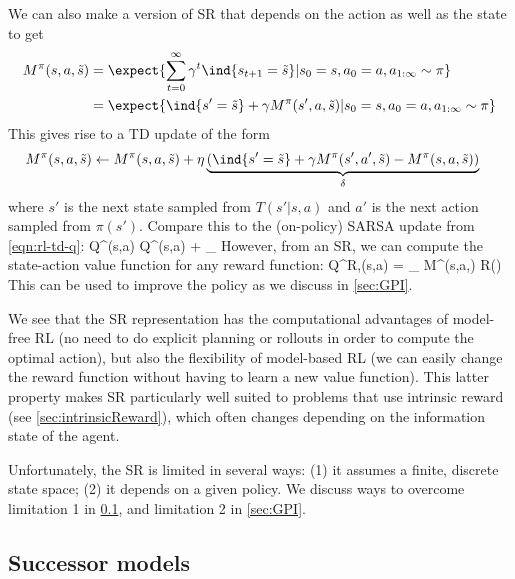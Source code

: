 We can also make a version of SR that depends on the action
as well as the state to get
\begin{align}
M^{\pi}(s,a,\tilde{s})
&= \expect{\sum_{t=0}^{\infty} \gamma^t \ind{s_{t+1}=\tilde{s}}
  \vert s_0=s, a_0=a, a_{1:\infty} \sim \pi} \\
&= \expect{\ind{s'=\tilde{s}} + \gamma M^{\pi}(s',a,\tilde{s})
  \vert s_0=s, a_0=a, a_{1:\infty} \sim \pi}
\end{align}
This gives rise to a TD update of the form
\begin{align}
  M^{\pi}(s,a,\tilde{s}) &\leftarrow
  M^{\pi}(s,a,\tilde{s}) + \eta 
  \underbrace{\left( \ind{s'=\tilde{s}} + \gamma M^{\pi}(s',a',\tilde{s})
     - M^{\pi}(s,a,\tilde{s}) \right)}_{\delta}
\end{align}
where $s'$ is the next state sampled from $T(s'|s,a)$
and $a'$ is the next action sampled from $\pi(s')$.
Compare this to the (on-policy) SARSA update from
\cref{eqn:rl-td-q}:
\be
Q^{\pi}(s,a) \leftarrow
Q^{\pi}(s,a) + \eta {}_{\delta}
\ee
However, from an SR, we can compute the state-action value function
for any reward function:
\be
Q^{R,\pi}(s,a) = \sum_{} M^{\pi}(s,a,) R()
\ee
This can be used to improve the policy as we discuss
in \cref{sec:GPI}.

We see that the SR  representation has the computational
advantages of model-free RL (no need to do explicit planning or rollouts
in order to compute the  optimal action),
but also the flexibility of model-based RL
(we can easily change the reward function without having
to learn a new value function).
This latter property makes SR particularly well suited
to problems that use intrinsic reward (see \cref{sec:intrinsicReward}),
which often changes depending on the information state of the agent.

Unfortunately, the SR is limited in several ways:
(1) it assumes a finite, discrete state space;
(2)  it depends on a given policy.
We discuss ways to overcome limitation 1 in
\cref{sec:SM},  and limitation 2 in \cref{sec:GPI}.


\subsection{Successor models}
\label{sec:SM}

